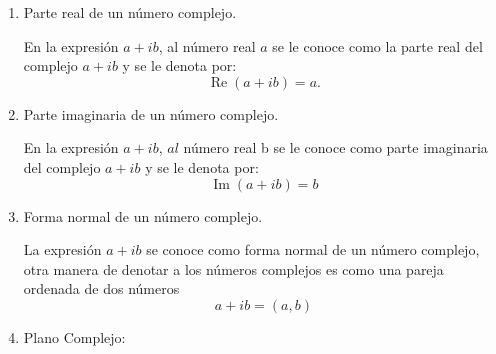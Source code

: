 \documentclass{article}
\begin{document}
    \begin{enumerate}[label=\roman*)]
    \item Parte real de un número complejo.
    
    En la expresión $a+i b$, al número real $a$ se le conoce como la parte real del complejo $a+i b$ y se le denota por:
    $$
    \operatorname{Re}(a+i b)=a .
    $$

    
    \item Parte imaginaria de un número complejo.
    
    En la expresión $a+i b$, $a l$ número real b se le conoce como parte imaginaria del complejo $a+i b$ y se le denota por:
    $$
    \operatorname{Im}(a+i b)=b
    $$

    \item Forma normal de un número complejo.
    
    La expresión $a+i b$ se conoce como forma normal de un número complejo, otra manera de denotar a los números complejos es como una  pareja ordenada de dos números
    $$
    a+ib =(a, b)
    $$

    \item Plano Complejo:
     
    \begin{center}
    \end{center}
    \end{enumerate}
    \newpage

    
\end{document}
